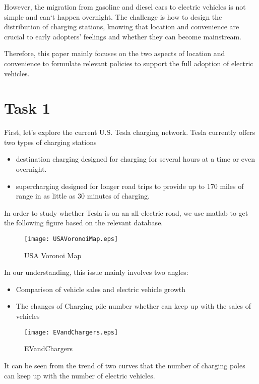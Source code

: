 \documentclass{mcmthesis}
\begin{document}
   However, the migration from gasoline and diesel cars to electric vehicles is not simple and can`t happen overnight. The challenge is how to design the distribution of charging stations, knowing that location and convenience are crucial to early adopters' feelings and whether they can become mainstream.
   
   Therefore, this paper mainly focuses on the two aspects of location and convenience to formulate relevant policies to support the full adoption of electric vehicles.

\section{Task 1}

First, let's explore the current U.S. Tesla charging network. Tesla currently offers two types of charging stations


\begin{itemize}
\item destination charging designed for charging for several hours at a time or even overnight.
\item supercharging designed for longer road trips to provide up to 170 miles of range in as little as 30 minutes of charging.
\end{itemize}

In order to study whether Tesla is on an all-electric road, we use matlab to get the following figure based on the relevant database.

\begin{figure}[H]
\small
\centering
\texttt{[image: USAVoronoiMap.eps]}
\caption{USA Voronoi Map} 
\end{figure}

In our understanding, this issue mainly involves two angles:

\begin{itemize}
\item Comparison of vehicle sales and electric vehicle growth
\item The changes of Charging pile number whether can keep up with the sales of vehicles
\end{itemize}

\begin{figure}[htbp]
\small
\centering
\texttt{[image: EVandChargers.eps]}
\caption{EVandChargers} 
\end{figure}

It can be seen from the trend of two curves that the number of charging poles can keep up with the number of electric vehicles.
\end{document}
